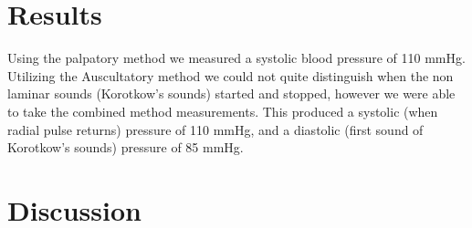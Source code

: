 \documentclass[12pt]{article}
\begin{document}
\section{Results}
Using the palpatory method we measured a systolic blood pressure of 110 mmHg. Utilizing the Auscultatory method we could not quite distinguish when the non laminar sounds (Korotkow's sounds) started and stopped, however we were able to take the combined method measurements. This produced a systolic (when radial pulse returns) pressure of 110 mmHg, and a diastolic (first sound of Korotkow's sounds) pressure of 85 mmHg.
\section{Discussion}


%
%
\end{document}
